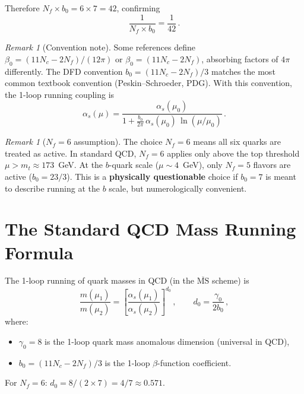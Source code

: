 \documentclass[11pt,a4paper]{article}
\newcommand{\as}{\alpha_s}
\newcommand{\Nf}{N_f}
\newcommand{\Nc}{N_c}
\theoremstyle{definition}
\theoremstyle{remark}
\newtheorem{remark}[theorem]{Remark}
\begin{document}
Therefore $\Nf \times b_0 = 6 \times 7 = 42$, confirming
\begin{equation}
\frac{1}{\Nf \times b_0} = \frac{1}{42}\,.
\end{equation}

\begin{remark}[Convention note]
Some references define $\beta_0 = (11\Nc - 2\Nf)/(12\pi)$ or
$\beta_0 = (11\Nc - 2\Nf)$, absorbing factors of $4\pi$ differently.
The DFD convention $b_0 = (11\Nc - 2\Nf)/3$ matches the most common
textbook convention (Peskin--Schroeder, PDG).  With this convention,
the 1-loop running coupling is
\[
\as(\mu) = \frac{\as(\mu_0)}{1 + \frac{b_0}{2\pi}\,\as(\mu_0)\,\ln(\mu/\mu_0)}\,.
\]
\end{remark}

\begin{remark}[$\Nf = 6$ assumption]
The choice $\Nf = 6$ means all six quarks are treated as active.
In standard QCD, $\Nf = 6$ applies only above the top threshold
$\mu > m_t \approx 173$~GeV.  At the $b$-quark scale ($\mu \sim 4$~GeV),
only $\Nf = 5$ flavors are active ($b_0 = 23/3$).  This is a
\textbf{physically questionable} choice if $b_0 = 7$ is meant to describe
running at the $b$ scale, but numerologically convenient.
\end{remark}

\section{The Standard QCD Mass Running Formula}
\label{sec:running}

The 1-loop running of quark masses in QCD (in the $\overline{\mathrm{MS}}$ scheme) is
\begin{equation}\label{eq:mass-running}
\frac{m(\mu_1)}{m(\mu_2)} = \left[\frac{\as(\mu_1)}{\as(\mu_2)}\right]^{d_0}\,,
\qquad
d_0 = \frac{\gamma_0}{2b_0}\,,
\end{equation}
where:
\begin{itemize}
\item $\gamma_0 = 8$ is the 1-loop quark mass anomalous dimension (universal in QCD),
\item $b_0 = (11\Nc - 2\Nf)/3$ is the 1-loop $\beta$-function coefficient.
\end{itemize}

For $\Nf = 6$: $d_0 = 8/(2 \times 7) = 4/7 \approx 0.571$.
\end{document}
